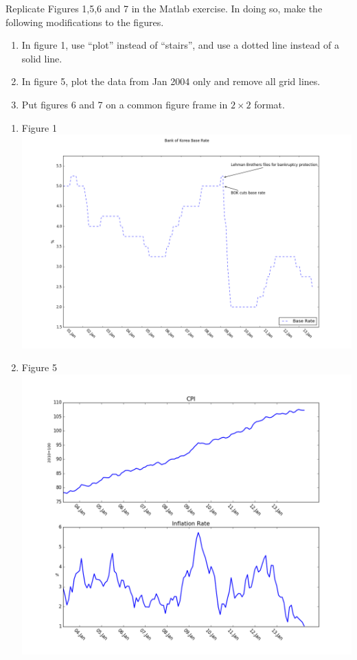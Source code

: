 \documentclass[answers]{exam}
\begin{document}
\newpage
{}
\begin{questions}
  \question
  Replicate Figures 1,5,6 and 7 in the Matlab exercise. In doing so, make the following modifications to the figures.
  \begin{enumerate}[(1)]
    \item In figure 1, use ``plot'' instead of ``stairs'', and use a dotted line instead of a solid line.
    \item In figure 5, plot the data from Jan 2004 only and remove all grid lines.
    \item Put figures 6 and 7 on a common figure frame in $2\times 2$ format.
  \end{enumerate}
  \begin{solution}
    \begin{enumerate}[(1)]
      \item Figure 1
      \includegraphics[scale=0.3]{figure_1.png}
      \item Figure 5
      \includegraphics[scale=0.3]{figure_5.png}

\end{enumerate}
\end{solution}
\end{questions}
\end{document}

